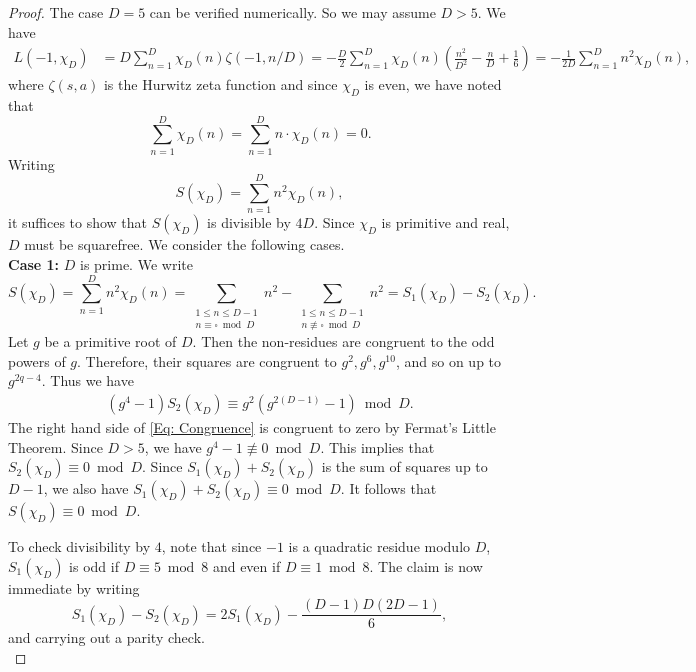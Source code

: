 \documentclass[11pt]{amsart}
\numberwithin{equation}{section}
\theoremstyle{remark}
\begin{document}
\begin{proof}
The case $D=5$ can be verified numerically. So we may assume $D>5$. We have
\begin{align*}
L\left(-1, {\chi_{D}}\right) & =D \sum_{n=1}^{D} {\chi_{D}}(n) \zeta\left(-1, n/D\right)  =-\frac{D}{2} \sum_{n=1}^{D} {\chi_{D}}(n)\left(\frac{n^2}{D^2}-\frac{n}{D}+\frac{1}{6}\right) =-\frac{1}{2 D} \sum_{n=1}^{D} n^2 {\chi_{D}}(n),
\end{align*}
where $\zeta(s, a)$ is the Hurwitz zeta function and since ${\chi_{D}}$ is even, we have noted that
\[
\sum_{n=1}^{D} {\chi_{D}}(n)=\sum_{n=1}^{D} n \cdot {\chi_{D}}(n)=0 .
\]
Writing
\[
S({\chi_{D}}) = \sum_{n=1}^{D}n^2 {\chi_{D}}(n),
\]
it suffices to show that $S({\chi_{D}})$ is divisible by $4D$. Since ${\chi_{D}}$ is primitive and real, $D$ must be squarefree. We consider the following cases.\\

\noindent \textbf{Case 1:}  $D$ is prime. We write
\[
S({\chi_{D}}) = \sum_{n=1}^{D}n^2 {\chi_{D}}(n) = \sum_{\substack{1 \leq n \leq D-1 \\ n \equiv \square \bmod D}}n^2-\sum_{\substack{1 \leq n \leq D-1 \\ n \not \equiv \square \bmod D}}n^2 =S_1({\chi_{D}})-S_2({\chi_{D}}). 
\]
Let $g$ be a primitive root of $D$. Then the non-residues are congruent to the odd powers of $g$. Therefore, their squares are congruent to $g^2, g^6, g^{10}$, and so on up to $g^{2q-4}$. Thus we have 
\begin{align}\label{Eq: Congruence}
\left(g^4-1\right) S_2({\chi_{D}}) \equiv g^2(g^{2(D-1)}-1) \bmod D.
\end{align}
The right hand side of \eqref{Eq: Congruence} is congruent to zero by Fermat's Little Theorem. Since $D>5$, we have $g^4-1 \not \equiv 0 \bmod D$. This implies that $S_2({\chi_{D}}) \equiv 0 \bmod D$. Since $S_1({\chi_{D}})+S_2({\chi_{D}})$ is the sum of squares up to $D-1$, we also have $S_1({\chi_{D}})+S_2({\chi_{D}}) \equiv 0 \bmod D$. It follows that $S({\chi_{D}}) \equiv 0 \bmod D$.
\par
To check divisibility by $4$, note that since $-1$ is a quadratic residue modulo $D$, $S_1({\chi_{D}})$ is odd if $D \equiv 5 \bmod 8$ and even if $D \equiv1 \bmod 8$. The claim is now immediate by writing
\[ S_1({\chi_{D}})-S_2({\chi_{D}}) = 2S_1({\chi_{D}}) - \frac{(D-1)D(2D-1)}{6},
\]
and carrying out a parity check.\\


\end{proof}
\end{document}
